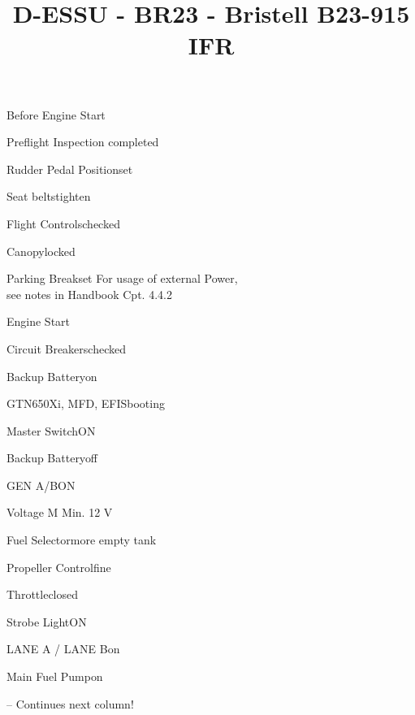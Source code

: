 \def\papersize{5}




\title{D-ESSU  -  BR23  -  Bristell B23-915 IFR}

\begin{checklist}{Before Engine Start}
  \item{Preflight Inspection  }{completed}
  \item{Rudder Pedal Position}{set}
  \item{Seat belts}{tighten}
  \item{Flight Controls}{checked}
  \item{Canopy}{locked}
  \item{Parking Break}{set}
For usage of external Power,\\see notes in Handbook Cpt. 4.4.2
\end{checklist}

\begin{checklist}{Engine Start}
  \item{Circuit Breakers}{checked}
  \item{Backup Battery}{on}
  \item{GTN650Xi, MFD, EFIS}{booting}

  \item{Master Switch}{ON}


  \item{Backup Battery}{off}
  \item{GEN A/B}{ON}
  \item{Voltage M }{Min. 12 V}
  \item{Fuel Selector}{more empty tank}
  \item{Propeller Control}{fine}
  \item{Throttle}{closed}
  \item{Strobe Light}{ON}
  \item{LANE A / LANE B}{on}
  \item{Main Fuel Pump}{on} 

-- Continues next column!
\end{checklist}

